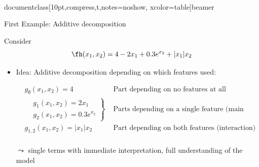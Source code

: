 \\documentclass[10pt,compress,t,notes=noshow, xcolor=table]{beamer}
\begin{document}
\begin{frame}{First Example: Additive decomposition}

    \begin{example}

    Consider
    $$
    \fh(x_1, x_2) = 4 - 2x_1 + 0.3 e^{x_2} + |x_1|x_2
    $$

    \begin{itemize}
    
        \item Idea: Additive decomposition depending on which features used:
        
        \pause
        \begin{equation}\label{eq:func_decomp_first_min_example}
        \begin{aligned}
            & g_\emptyset(x_1, x_2) = 4 & \text{ Part depending on no features at all (intercept)}  \\
            &
            \left.\begin{aligned}
                & g_1(x_1, x_2) = 2x_1 \\
                & g_2(x_1, x_2) = 0.3 e^{x_2}
            \end{aligned}\right\}
                & \text{ Parts depending on a single feature (main effects)}  \\
            & g_{1,2}(x_1, x_2) = |x_1|x_2 & \text{ Part depending on both features (interaction)}  \\
        \end{aligned}
        \end{equation}
        \item[$\leadsto$] single terms with immediate interpretation, full understanding of the model


\end{itemize}
\end{example}
\end{frame}
\end{document}
